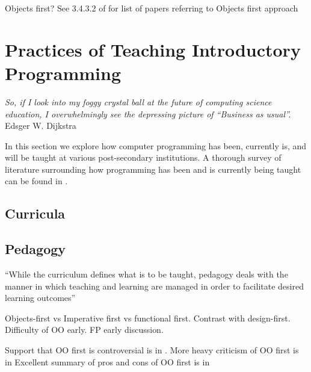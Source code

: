 Objects first?  See 3.4.3.2 of \cite{Pears07} for list of papers referring to Objects first approach

\section{Practices of Teaching Introductory Programming}

\begin{flushright}
\textit{So, if I look into my foggy crystal ball at the future of computing science education, I overwhelmingly see the depressing picture of ``Business as usual''.}
\\
Edsger W. Dijkstra \cite{Dijkstra89} \\
\end{flushright}


In this section we explore how computer programming has been, currently is, and will be taught at various post-secondary institutions.  A thorough survey of literature surrounding how programming has been and is currently being taught can be found in \cite{Pears07}.

\subsection{Curricula}

\subsection{Pedagogy}

``While the curriculum defines what is to be taught, pedagogy deals with the manner in which teaching and learning are managed in order to facilitate desired learning outcomes''



Objects-first vs Imperative first vs functional first.  Contrast with design-first.  Difficulty of OO early.  FP early discussion.

Support that OO first is controversial is in \cite{Astrachan05}.  More heavy criticism of OO first is in \cite{Hu04} Excellent summary of pros and cons of OO first is in \cite{Lister06}

